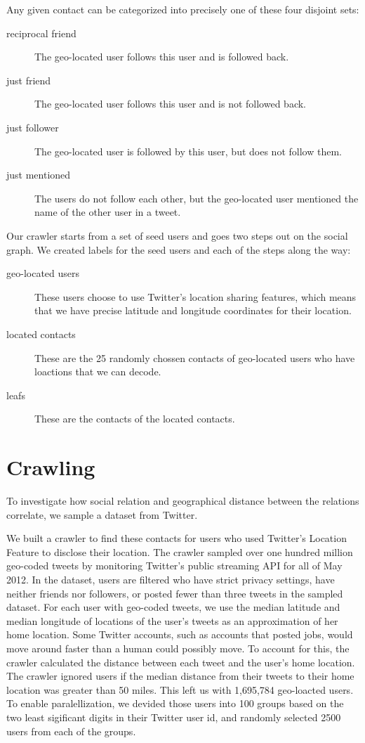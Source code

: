 Any given contact can be categorized into precisely one of these four disjoint
sets:
\begin{description}
\item[reciprocal friend] The geo-located user follows this user and is followed
    back.
\item[just friend] The geo-located user follows this user and is not followed
    back.
\item[just follower] The geo-located user is followed by this user, but does
    not follow them.
\item[just mentioned] The users do not follow each other, but the geo-located
    user mentioned the name of the other user in a tweet.
\end{description}

Our crawler starts from a set of seed users and goes two steps out on the
social graph.
%
We created labels for the seed users and each of the steps along the way:

\begin{description}
\item[geo-located users] These users choose to use Twitter's location sharing
    features, which means that we have precise latitude and longitude
    coordinates for their location.
\item[located contacts] These are the 25 randomly chossen contacts of
    geo-located users who have loactions that we can decode.
\item[leafs] These are the contacts of the located contacts.
\end{description}

\section{Crawling}
To investigate how social relation and geographical distance between the
relations correlate, we sample a dataset from Twitter.

We built a crawler to find these contacts for users who used Twitter's Location
Feature to disclose their location.
The crawler sampled over one hundred million geo-coded tweets by monitoring
Twitter's public streaming API for all of May 2012.
In the dataset, users are filtered who have strict privacy settings, have
neither friends nor followers, or posted fewer than three tweets in the sampled
dataset.
For each user with geo-coded tweets, we use the median latitude and median
longitude of locations of the user's tweets as an approximation of her home
location.
Some Twitter accounts, such as accounts that posted jobs, would
move around faster than a human could possibly move.
To account for this, the crawler calculated the distance between each tweet and
the user's home location.
The crawler ignored users if the median distance from their tweets to their
home location was greater than 50 miles.
This left us with 1,695,784 geo-loacted users.
To enable paralellization, we devided those users into 100 groups based on
the two least sigificant digits in their Twitter user id, and randomly selected
2500 users from each of the groups.

